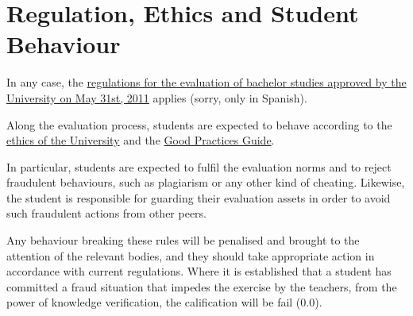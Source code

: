 \documentclass[11pt, a4paper, twoside]{article}
\begin{document}
\section{Regulation, Ethics and Student Behaviour}

In any case, the
\href{http://www.uc3m.es/portal/page/portal/organizacion/secret_general/normativa/estudiantes/estudios_grado/normativa-evaluacion-continua-31-05-11_FINALx.pdf}{regulations
for the evaluation of bachelor studies approved by the University on May 31st,
2011} applies (sorry, only in Spanish).

Along the evaluation process, students are expected to behave according to the
\href{http://www.uc3m.es/portal/page/portal/conocenos/nuestros_estudios/grados/tu_compromiso_universidad}{ethics
of the University} and the
\href{http://www.uc3m.es/ss/Satellite/UC3MInstitucional/en/TextoMixta/1371206782958/Guia_de_las_buenas_practicas}{Good
Practices Guide}.

In particular, students are expected to fulfil the evaluation norms and to
reject fraudulent behaviours, such as plagiarism or any other kind of cheating.
Likewise, the student is responsible for guarding their evaluation assets in
order to avoid such fraudulent actions from other peers.

Any behaviour breaking these rules will be penalised and brought to the
attention of the relevant bodies, and they should take appropriate action
in accordance with current regulations. Where it is established that a student
has committed a fraud situation that impedes the exercise by the teachers, from
the power of knowledge verification, the calification will be fail (0.0).
\end{document}
